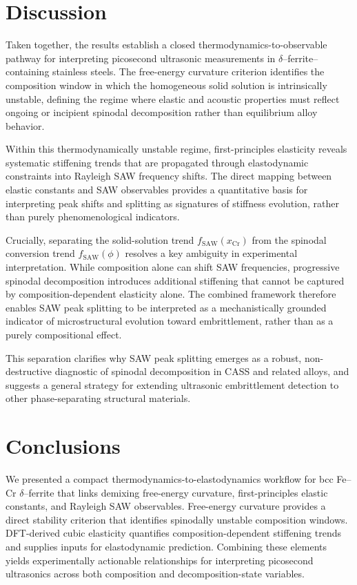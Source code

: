 \documentclass[final,3p,times]{elsarticle}
\begin{document}
\section{Discussion}

Taken together, the results establish a closed thermodynamics-to-observable pathway for interpreting picosecond ultrasonic measurements in $\delta$--ferrite–containing stainless steels. The free-energy curvature criterion identifies the composition window in which the homogeneous solid solution is intrinsically unstable, defining the regime where elastic and acoustic properties must reflect ongoing or incipient spinodal decomposition rather than equilibrium alloy behavior.

Within this thermodynamically unstable regime, first-principles elasticity reveals systematic stiffening trends that are propagated through elastodynamic constraints into Rayleigh SAW frequency shifts. The direct mapping between elastic constants and SAW observables provides a quantitative basis for interpreting peak shifts and splitting as signatures of stiffness evolution, rather than purely phenomenological indicators.

Crucially, separating the solid-solution trend $f_{\mathrm{SAW}}(x_{\mathrm{Cr}})$ from the spinodal conversion trend $f_{\mathrm{SAW}}(\phi)$ resolves a key ambiguity in experimental interpretation. While composition alone can shift SAW frequencies, progressive spinodal decomposition introduces additional stiffening that cannot be captured by composition-dependent elasticity alone. The combined framework therefore enables SAW peak splitting to be interpreted as a mechanistically grounded indicator of microstructural evolution toward embrittlement, rather than as a purely compositional effect.

This separation clarifies why SAW peak splitting emerges as a robust, non-destructive diagnostic of spinodal decomposition in CASS and related alloys, and suggests a general strategy for extending ultrasonic embrittlement detection to other phase-separating structural materials.


\section{Conclusions}
We presented a compact thermodynamics-to-elastodynamics workflow for bcc Fe--Cr $\delta$--ferrite that links demixing free-energy curvature, first-principles elastic constants, and Rayleigh SAW observables. Free-energy curvature provides a direct stability criterion that identifies spinodally unstable composition windows. DFT-derived cubic elasticity quantifies composition-dependent stiffening trends and supplies inputs for elastodynamic prediction. Combining these elements yields experimentally actionable relationships for interpreting picosecond ultrasonics across both composition and decomposition-state variables.
\end{document}
